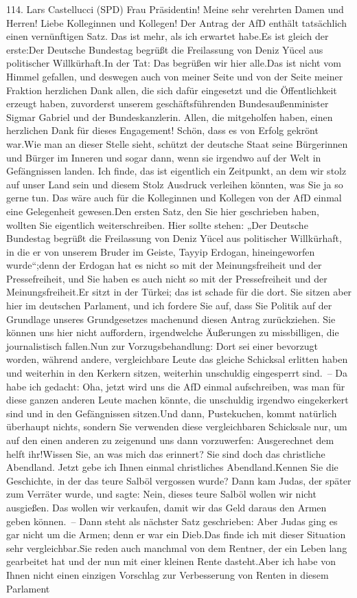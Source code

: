 \documentclass{article}
\begin{document}
	114. Lars Castellucci (SPD) Frau Präsidentin! Meine sehr verehrten Damen und Herren! Liebe Kolleginnen und Kollegen! Der Antrag der AfD enthält tatsächlich einen vernünftigen Satz. Das ist mehr, als ich erwartet habe.Es ist gleich der erste:Der Deutsche Bundestag begrüßt die Freilassung von Deniz Yücel aus politischer Willkürhaft.In der Tat: Das begrüßen wir hier alle.Das ist nicht vom Himmel gefallen, und deswegen auch von meiner Seite und von der Seite meiner Fraktion herzlichen Dank allen, die sich dafür eingesetzt und die Öffentlichkeit erzeugt haben, zuvorderst unserem geschäftsführenden Bundesaußenminister Sigmar Gabriel und der Bundeskanzlerin. Allen, die mitgeholfen haben, einen herzlichen Dank für dieses Engagement! Schön, dass es von Erfolg gekrönt war.Wie man an dieser Stelle sieht, schützt der deutsche Staat seine Bürgerinnen und Bürger im Inneren und sogar dann, wenn sie irgendwo auf der Welt in Gefängnissen landen. Ich finde, das ist eigentlich ein Zeitpunkt, an dem wir stolz auf unser Land sein und diesem Stolz Ausdruck verleihen könnten, was Sie ja so gerne tun. Das wäre auch für die Kolleginnen und Kollegen von der AfD einmal eine Gelegenheit gewesen.Den ersten Satz, den Sie hier geschrieben haben, wollten Sie eigentlich weiterschreiben. Hier sollte stehen: „Der Deutsche Bundestag begrüßt die Freilassung von Deniz Yücel aus politischer Willkürhaft, in die er von unserem Bruder im Geiste, Tayyip Erdogan, hineingeworfen wurde“;denn der Erdogan hat es nicht so mit der Meinungsfreiheit und der Pressefreiheit, und Sie haben es auch nicht so mit der Pressefreiheit und der Meinungsfreiheit.Er sitzt in der Türkei; das ist schade für die dort. Sie sitzen aber hier im deutschen Parlament, und ich fordere Sie auf, dass Sie Politik auf der Grundlage unseres Grundgesetzes machenund diesen Antrag zurückziehen. Sie können uns hier nicht auffordern, irgendwelche Äußerungen zu missbilligen, die journalistisch fallen.Nun zur Vorzugsbehandlung: Dort sei einer bevorzugt worden, während andere, vergleichbare Leute das gleiche Schicksal erlitten haben und weiterhin in den Kerkern sitzen, weiterhin unschuldig eingesperrt sind. – Da habe ich gedacht: Oha, jetzt wird uns die AfD einmal aufschreiben, was man für diese ganzen anderen Leute machen könnte, die unschuldig irgendwo eingekerkert sind und in den Gefängnissen sitzen.Und dann, Pustekuchen, kommt natürlich überhaupt nichts, sondern Sie verwenden diese vergleichbaren Schicksale nur, um auf den einen anderen zu zeigenund uns dann vorzuwerfen: Ausgerechnet dem helft ihr!Wissen Sie, an was mich das erinnert? Sie sind doch das christliche Abendland. Jetzt gebe ich Ihnen einmal christliches Abendland.Kennen Sie die Geschichte, in der das teure Salböl vergossen wurde? Dann kam Judas, der später zum Verräter wurde, und sagte: Nein, dieses teure Salböl wollen wir nicht ausgießen. Das wollen wir verkaufen, damit wir das Geld daraus den Armen geben können. – Dann steht als nächster Satz geschrieben: Aber Judas ging es gar nicht um die Armen; denn er war ein Dieb.Das finde ich mit dieser Situation sehr vergleichbar.Sie reden auch manchmal von dem Rentner, der ein Leben lang gearbeitet hat und der nun mit einer kleinen Rente dasteht.Aber ich habe von Ihnen nicht einen einzigen Vorschlag zur Verbesserung von Renten in diesem Parlament 
\end{document}
